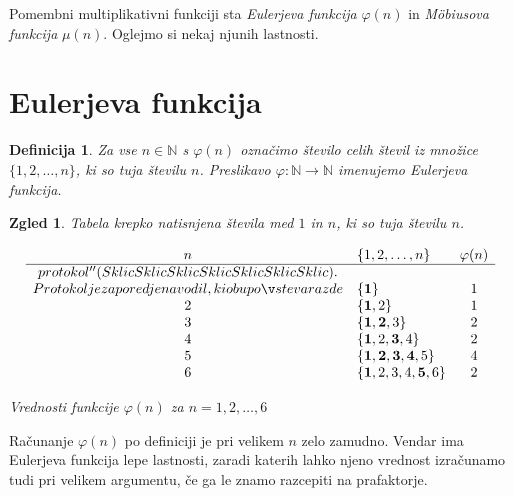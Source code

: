\documentclass[a4paper,12pt]{article}
\def\N{\mathbb{N}} %
\newtheorem{definicija}{Definicija}
\newtheorem{zgled}{Zgled}
\begin{document}
Pomembni multiplikativni funkciji sta {\em Eulerjeva funkcija\/} $\varphi(n)$ in {\em M\"obiusova funkcija\/} $\mu(n)$. Oglejmo si nekaj njunih lastnosti.



\section{Eulerjeva funkcija}


\begin{definicija}
Za vse $n \in \N$ s $\varphi(n)$ označimo število 
celih števil iz množice $\{1, 2, \ldots, n\}$, ki so tuja številu $n$.
Preslikavo $\varphi: \N \to \N$ imenujemo \em{Eulerjeva funkcija}.
\end{definicija}

\begin{zgled}
Tabela %
krepko natisnjena števila med $1$ in $n$, ki so tuja številu $n$. %
\begin{table}[h]
\[
\begin{array}{clc}
 n & \{1,2,\ldots, n\}          & \varphi(n)       \\
 \hline
protokol'' (Sklic Sklic Sklic Sklic Sklic Sklic Sklic). \\ Protokol je zaporedje navodil, ki ob upoštevarazde & \{{\bf 1}\}                    &     1      \\
 2 & \{{\bf 1},2 \}                &     1      \\
 3 & \{{\bf 1,2},3 \}             &     2      \\
 4 & \{{\bf 1},2,{\bf 3},4 \} &     2      \\
 5 & \{{\bf 1,2,3,4},5 \}       &     4      \\
 6 & \{{\bf 1},2,3,4,{\bf 5},6 \} &     2
\end{array}
\] 
\caption{Vrednosti funkcije $\varphi(n)$ za $n = 1,2,\ldots,6$}\label{fi}
\end{table}

\end{zgled}

Računanje $\varphi(n)$ po definiciji je pri velikem $n$ zelo zamudno. Vendar ima 
Eulerjeva funkcija lepe lastnosti, zaradi katerih lahko njeno vrednost izračunamo
tudi pri velikem argumentu, če ga le znamo razcepiti na prafaktorje.
\end{document}
